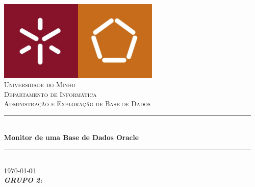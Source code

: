 \documentclass[a4paper]{article}
\begin{document}
\begin{titlepage}
\begin{center}

\includegraphics[width=0.6\textwidth]{capa/logo.jpg}\\[.75cm]

\textsc{\LARGE Universidade do Minho}\\[0.7cm] %
\textsc{\Large Departamento de Informática}\\[0.7cm] %
\textsc{\large Administração e Exploração de Base de Dados}\\[0.7cm] %

\rule{\linewidth}{0.5mm} \\[0.5cm]
{ \huge \bfseries Monitor de uma Base de Dados Oracle\\[0.5cm] }
\rule{\linewidth}{0.5mm}\\[0.7cm]

{\Large \today}\\[1cm] %

\emph{\Large \textbf{GRUPO 2:} }\\[0.6cm]


\end{center}
\end{titlepage}
\end{document}
